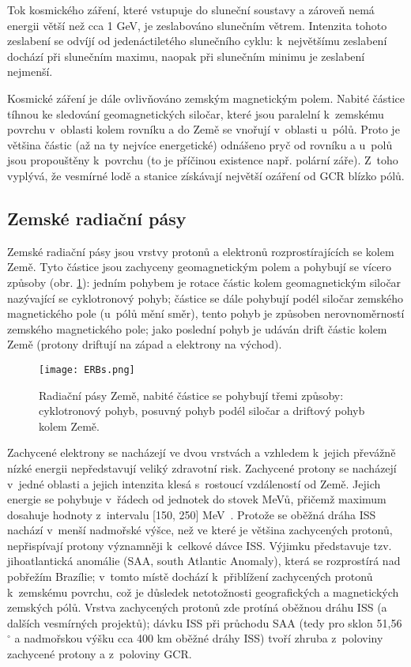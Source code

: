 Tok kosmického záření, které vstupuje do sluneční soustavy a zároveň nemá energii větší než cca 1 GeV, je zeslabováno slunečním větrem. Intenzita tohoto zeslabení se odvíjí od jedenáctiletého slunečního cyklu: k~největšímu zeslabení dochází při slunečním maximu, naopak při slunečním minimu je zeslabení nejmenší. 

Kosmické záření je dále ovlivňováno zemským magnetickým polem. Nabité částice tíhnou ke sledování geomagnetických siločar, které jsou paralelní k~zemskému povrchu v~oblasti kolem rovníku a do Země se vnořují v~oblasti u~pólů. Proto je většina částic (až na ty nejvíce energetické) odnášeno pryč od rovníku a u~polů jsou propouštěny k~povrchu (to je příčinou existence např. polární záře). Z~toho vyplývá, že vesmírné lodě a stanice získávají největší ozáření od GCR blízko pólů.

\subsection{Zemské radiační pásy}
Zemské radiační pásy jsou vrstvy protonů a elektronů rozprostírajících se kolem Země. Tyto částice jsou zachyceny geomagnetickým polem a pohybují se vícero způsoby (obr. \ref{fig:ERBs}): jedním pohybem je rotace částic kolem geomagnetickým siločar nazývající se cyklotronový pohyb; částice se dále pohybují podél siločar zemského magnetického pole (u~pólů mění směr), tento pohyb je způsoben nerovnoměrností zemského magnetického pole; jako poslední pohyb je udáván drift částic kolem Země (protony driftují na západ a elektrony na východ).
\begin{figure}[H]
  \centering
  \texttt{[image: ERBs.png]}
  \caption{Radiační pásy Země, nabité částice se pohybují třemi způsoby: cyklotronový pohyb, posuvný pohyb podél siločar a driftový pohyb kolem Země. \cite{benton}}
  \label{fig:ERBs}
\end{figure}

Zachycené elektrony se nacházejí ve dvou vrstvách a vzhledem k~jejich převážně nízké energii nepředstavují veliký zdravotní risk. Zachycené protony se nacházejí v~jedné oblasti a jejich intenzita klesá s~rostoucí vzdáleností od Země. Jejich energie se pohybuje v~řádech od jednotek do stovek MeVů, přičemž maximum dosahuje hodnoty z~intervalu [150, 250] MeV~\cite{benton}. Protože se oběžná dráha ISS nachází v~menší nadmořské výšce, než ve které je většina zachycených protonů, nepřispívají protony významněji k~celkové dávce ISS. Výjimku představuje tzv. jihoatlantická anomálie (SAA, south Atlantic Anomaly), která se rozprostírá nad pobřežím Brazílie; v~tomto místě dochází k~přiblížení zachycených protonů k~zemskému povrchu, což je důsledek netotožnosti geografických a magnetických zemských pólů.
Vrstva zachycených protonů zde protíná oběžnou dráhu ISS (a dalších vesmírných projektů); dávku ISS při průchodu SAA (tedy pro sklon 51,56$^\circ$ a nadmořskou výšku cca 400 km oběžné dráhy ISS)  tvoří zhruba z~poloviny zachycené protony a z~poloviny GCR.~\cite{benton}

